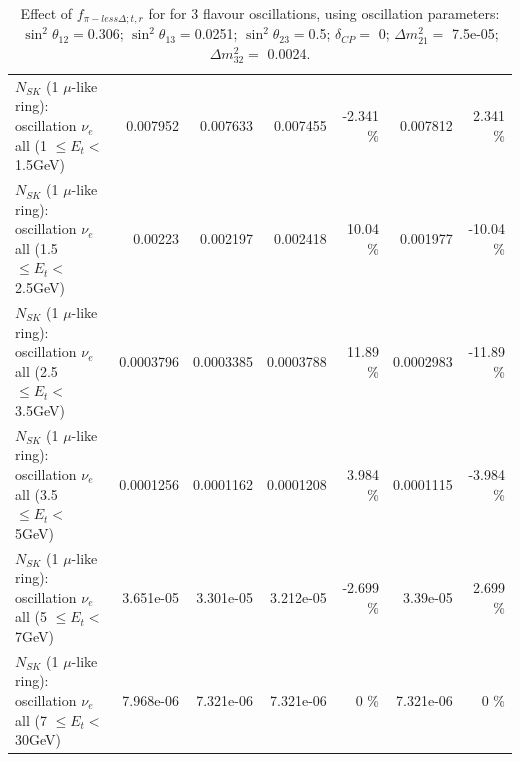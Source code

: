 \begin{table}
\begin{tabular}{| l | r | r | r  r | r  r |}
$N_{SK}$ (1 $\mu$-like ring): oscillation $\nu_{e}$ all (1 $\leq E_{t} <$ 1.5GeV) &        0.007952 &        0.007633 &        0.007455 &   -2.341 \%  &        0.007812 &    2.341 \%  \\ 
$N_{SK}$ (1 $\mu$-like ring): oscillation $\nu_{e}$ all (1.5 $\leq E_{t} <$ 2.5GeV) &         0.00223 &        0.002197 &        0.002418 &    10.04 \%  &        0.001977 &   -10.04 \%  \\ 
$N_{SK}$ (1 $\mu$-like ring): oscillation $\nu_{e}$ all (2.5 $\leq E_{t} <$ 3.5GeV) &       0.0003796 &       0.0003385 &       0.0003788 &    11.89 \%  &       0.0002983 &   -11.89 \%  \\ 
$N_{SK}$ (1 $\mu$-like ring): oscillation $\nu_{e}$ all (3.5 $\leq E_{t} <$ 5GeV) &       0.0001256 &       0.0001162 &       0.0001208 &    3.984 \%  &       0.0001115 &   -3.984 \%  \\ 
 $N_{SK}$ (1 $\mu$-like ring): oscillation $\nu_{e}$ all (5 $\leq E_{t} <$ 7GeV) &       3.651e-05 &       3.301e-05 &       3.212e-05 &   -2.699 \%  &        3.39e-05 &    2.699 \%  \\ 
$N_{SK}$ (1 $\mu$-like ring): oscillation $\nu_{e}$ all (7 $\leq E_{t} <$ 30GeV) &       7.968e-06 &       7.321e-06 &       7.321e-06 &        0 \%  &       7.321e-06 &        0 \%  \\ 
\hline
\hline
\end{tabular}
\caption{ Effect of $f_{\pi-less\Delta; t, r}$ for for 3 flavour oscillations, using oscillation parameters:  $\sin^2\theta_{12} = $0.306; $\sin^2\theta_{13} = $0.0251; $\sin^2\theta_{23} = $0.5; $\delta_{CP} = $        0; $\Delta m^2_{21} = $    7.5e-05; $\Delta m^2_{32} = $    0.0024. }
\label{tab:num_xsec_pilessdelta_1RmuT_3f_osc_t13:0.0251}
\end{table}
\clearpage
